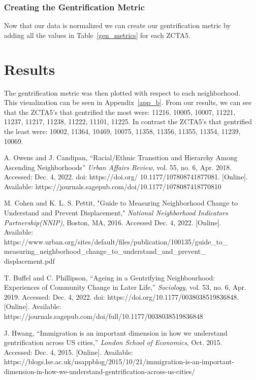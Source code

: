 \documentclass[conference]{IEEEtran}
\begin{document}
\subsubsection{Creating the Gentrification Metric}
Now that our data is normalized we can create our gentrification metric by adding all the values in Table~\ref{gen_metrics} for each ZCTA5.

\section{Results}
The gentrification metric was then plotted with respect to each neighborhood. This visualization can be seen in Appendix~\ref{app_b}. From our results, we can see that the ZCTA5's that gentrified the most were: 11216, 10005, 10007, 11221, 11237, 11217, 11238, 11222, 11101, 11225. In contrast the ZCTA5's that gentrified the least were: 10002, 11364, 10469, 10075, 11358, 11356, 11355, 11354, 11239, 10069.

\begin{thebibliography}{00}
 A. Owens and J. Candipan, ``Racial/Ethnic Transition and Hierarchy Among Ascending Neighborhoods'' \textit{Urban Affairs Review}, vol. 55, no. 6, Apr. 2018. Accessed: Dec. 4, 2022. doi: https://doi.org/ 10.1177/107808741877081. [Online]. Available: https://journals.sagepub.com/doi/10.1177/1078087418770810

 M. Cohen and K. L. S. Pettit, "Guide to Measuring Neighborhood Change to Understand and Prevent Displacement," \textit{National Neighborhood Indicators Partnership(NNIP)}, Boston, MA, 2016. Accessed Dec. 4, 2022. [Online]. Available: https://www.urban.org/sites/default/files/publication/100135/guide\_to\_ measuring\_neighborhood\_change\_to\_understand\_and\_prevent\_ displacement.pdf

 T. Buffel and C. Phillipson, “Ageing in a Gentrifying Neighbourhood: Experiences of Community Change in Later Life,” \textit{Sociology}, vol. 53, no. 6, Apr. 2019. Accessed: Dec. 4, 2022. doi: https://doi.org/10.1177/0038038519836848. [Online]. Available: https://journals.sagepub.com/doi/full/10.1177/0038038519836848

 J. Hwang, “Immigration is an important dimension in how we understand gentrification across US cities,” \textit{London School of Economics}, Oct. 2015. Accessed: Dec. 4, 2015. [Online]. Available: https://blogs.lse.ac.uk/usappblog/2015/10/21/immigration-is-an-important-dimension-in-how-we-understand-gentrification-across-us-cities/ 


\end{thebibliography}
\end{document}
